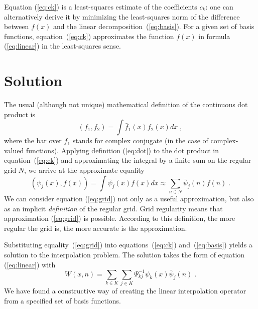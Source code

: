 Equation (\ref{eq:ck}) is a least-squares estimate of the coefficients
$c_k$: one can alternatively derive it by minimizing the least-squares
norm of the difference between $f(x)$ and the linear
decomposition~(\ref{eq:basis}). For a given set of basis functions,
equation~(\ref{eq:ck}) approximates the function $f(x)$ in formula
(\ref{eq:linear}) in the least-squares sense.


\section{Solution}

The usual (although not unique) mathematical definition of the
continuous dot product is
\begin{equation}\label{eq:dot}
  (f_1, f_2) = \int \bar{f}_1 (x) f_2 (x) dx \;,
\end{equation}
where the bar over $f_1$ stands for complex conjugate (in the case of
complex-valued functions). Applying definition (\ref{eq:dot}) to the
dot product in equation~(\ref{eq:ck}) and approximating the integral
by a finite sum on the regular grid $N$, we arrive at the approximate
equality
\begin{equation}\label{eq:grid}
  (\psi_j (x), f (x)) = \int \bar{\psi}_j (x) f (x) dx \approx
  \sum_{n \in N} \bar{\psi}_j (n) f (n)\;.
\end{equation}
We can consider equation (\ref{eq:grid}) not only as a useful
approximation, but also as an implicit \emph{definition} of the
regular grid. Grid regularity means that approximation (\ref{eq:grid})
is possible. According to this definition, the more regular the grid
is, the more accurate is the approximation.

Substituting equality~(\ref{eq:grid}) into equations~(\ref{eq:ck})
and~(\ref{eq:basis}) yields a solution to the interpolation problem.
The solution takes the form of equation (\ref{eq:linear}) with
\begin{equation}\label{eq:solution}
  W (x, n) = \sum_{k \in K} \sum_{j \in K} \Psi^{-1}_{kj} \psi_k
  (x) \bar{\psi}_j (n)\;.
\end{equation}
We have found a constructive way of creating the linear
interpolation operator from a specified set of basis functions.

